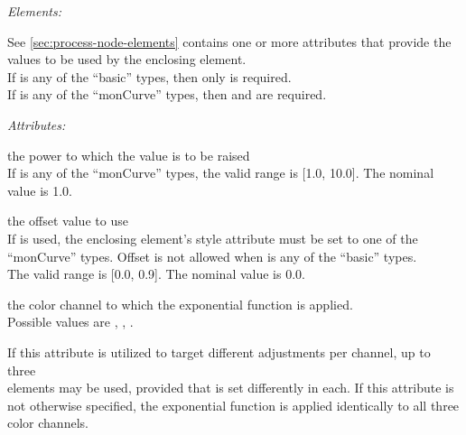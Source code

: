 
\emph{Elements:}
\begin{xmlfields}
    \xmlitem[Description][optional] See \autoref{sec:process-node-elements}
    \xmlitem[ExponentParams][required] contains one or more attributes that provide the values to be used by the enclosing  element. \\
    If  is any of the ``basic'' types, then only  is required. \\
    If  is any of the ``monCurve'' types, then  and  are required. \par
    
        \emph{Attributes:}
        \begin{xmlfields}
            \xmlitem["exponent"][required] the power to which the value is to be raised \\
            If  is any of the ``monCurve'' types, the valid range is [1.0, 10.0]. The nominal value is 1.0.
            
            
            \xmlitem["offset"][optional] the offset value to use \\
            If  is used, the enclosing  element's style attribute must be set to one of the ``monCurve'' types. Offset is not allowed when  is any of the ``basic'' types.\\
            The valid range is [0.0, 0.9]. The nominal value is 0.0.
            
            
            \xmlitem["channel"][optional] the color channel to which the exponential function is applied. \\
            Possible values are , , .
            
            If this attribute is utilized to target different adjustments per channel, up to three \\  elements may be used, provided that  is set differently in each. If this attribute is not otherwise specified, the exponential function is applied identically to all three color channels.
        \end{xmlfields}
\end{xmlfields}



